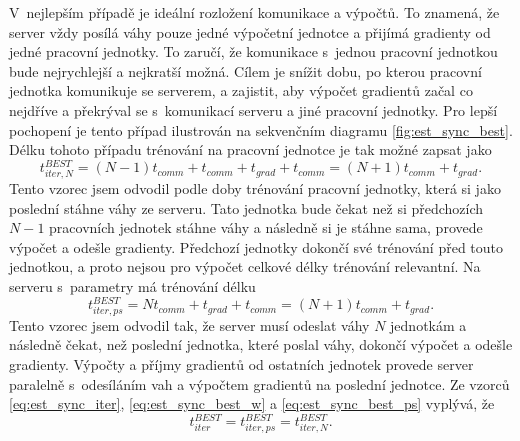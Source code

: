 V~nejlepším případě je ideální rozložení komunikace a výpočtů.
To znamená, že server vždy posílá váhy pouze jedné výpočetní jednotce a přijímá gradienty od jedné pracovní jednotky.
To zaručí, že komunikace s~jednou pracovní jednotkou bude nejrychlejší a nejkratší možná.
Cílem je snížit dobu, po kterou pracovní jednotka komunikuje se serverem, a zajistit, aby výpočet gradientů začal co nejdříve a překrýval se s~komunikací serveru a jiné pracovní jednotky.
Pro lepší pochopení je tento případ ilustrován na sekvenčním diagramu \ref{fig:est_sync_best}.
Délku tohoto případu trénování na pracovní jednotce je tak možné zapsat jako \begin{equation}t_{iter,N}^{BEST}=(N-1)t_{comm}+t_{comm}+t_{grad}+t_{comm}=(N+1)t_{comm}+t_{grad}.\label{eq:est_sync_best_w}\end{equation}
Tento vzorec jsem odvodil podle doby trénování pracovní jednotky, která si jako poslední stáhne váhy ze serveru.
Tato jednotka bude čekat než si předchozích $N-1$ pracovních jednotek stáhne váhy a následně si je stáhne sama, provede výpočet a odešle gradienty.
Předchozí jednotky dokončí své trénování před touto jednotkou, a proto nejsou pro výpočet celkové délky trénování relevantní.
Na serveru s~parametry má trénování délku \begin{equation}t_{iter,ps}^{BEST}=Nt_{comm}+t_{grad}+t_{comm}=(N+1)t_{comm}+t_{grad}.\label{eq:est_sync_best_ps}\end{equation}
Tento vzorec jsem odvodil tak, že server musí odeslat váhy $N$ jednotkám a následně čekat, než poslední jednotka, které poslal váhy, dokončí výpočet a odešle gradienty.
Výpočty a příjmy gradientů od ostatních jednotek provede server paralelně s~odesíláním vah a výpočtem gradientů na poslední jednotce.
Ze vzorců \ref{eq:est_sync_iter}, \ref{eq:est_sync_best_w} a \ref{eq:est_sync_best_ps} vyplývá, že \begin{equation}t_{iter}^{BEST}=t_{iter,ps}^{BEST}=t_{iter,N}^{BEST}.\label{eq:est_sync_best_f}\end{equation}

